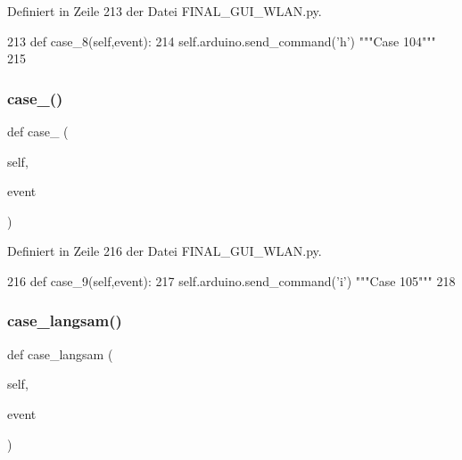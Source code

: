 Definiert in Zeile 213 der Datei F\+I\+N\+A\+L\+\_\+\+G\+U\+I\+\_\+\+W\+L\+A\+N.\+py.


\begin{DoxyCode}
213     \textcolor{keyword}{def }case\_8(self,event):
214         self.arduino.send\_command(\textcolor{stringliteral}{'h'})  \textcolor{stringliteral}{"""Case 104"""}
215 
\end{DoxyCode}
\mbox{\label{class_f_i_n_a_l___g_u_i___w_l_a_n_1_1_w_l_a_n_af3f145b8497ba552defce681ccab0f93}} 
\subsubsection{\texorpdfstring{case\+\_()}{case\_9()}}
{\footnotesize\ttfamily def case\+\_ (\begin{DoxyParamCaption}\item[{}]{self,  }\item[{}]{event }\end{DoxyParamCaption})}



Definiert in Zeile 216 der Datei F\+I\+N\+A\+L\+\_\+\+G\+U\+I\+\_\+\+W\+L\+A\+N.\+py.


\begin{DoxyCode}
216     \textcolor{keyword}{def }case\_9(self,event):
217         self.arduino.send\_command(\textcolor{stringliteral}{'i'})  \textcolor{stringliteral}{"""Case 105"""}
218     
\end{DoxyCode}
\mbox{\label{class_f_i_n_a_l___g_u_i___w_l_a_n_1_1_w_l_a_n_ab059a06421b1cb83fb66e670cc732629}} 
\subsubsection{\texorpdfstring{case\+\_\+langsam()}{case\_langsam()}}
{\footnotesize\ttfamily def case\+\_\+langsam (\begin{DoxyParamCaption}\item[{}]{self,  }\item[{}]{event }\end{DoxyParamCaption})}



